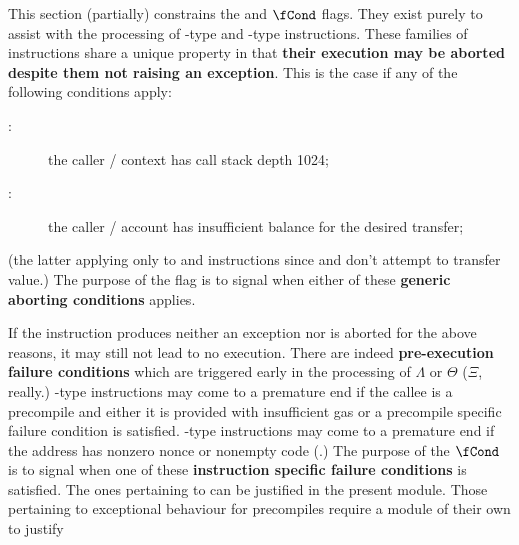 This section (partially) constrains the \abort{} and $\fCond$ flags. They exist purely to assist with the processing of -type and -type instructions. These families of instructions share a unique property in that \textbf{their execution may be aborted despite them not raising an exception}. This is the case if any of the following conditions apply:
\begin{description}
	\item[\csdAbortSH{}:] the caller / \creator{} context has call stack depth 1024;
	\item[\balAbortSH{}:] the caller / \creator{} account has insufficient balance for the desired transfer;
\end{description}
(the latter applying only to  and  instructions since  and  don't attempt to transfer value.) The purpose of the \abort{} flag is to signal when either of these \textbf{generic aborting conditions} applies.

If the instruction produces neither an exception nor is aborted for the above reasons, it may still not lead to no execution. There are indeed \textbf{pre-execution failure conditions} which are triggered early in the processing of $\Lambda$ or $\Theta$ ($\Xi$, really.) -type instructions may come to a premature end if the callee is a precompile and either it is provided with insufficient gas or a precompile specific failure condition is satisfied. -type instructions may come to a premature end if the \createe{} address has nonzero nonce or nonempty code (\deadAbortSH{}.)
The purpose of the $\fCond$ is to signal when one of these \textbf{instruction specific failure conditions} is satisfied. The ones pertaining to  can be justified in the present module. Those pertaining to exceptional behaviour for precompiles require a module of their own to justify 

